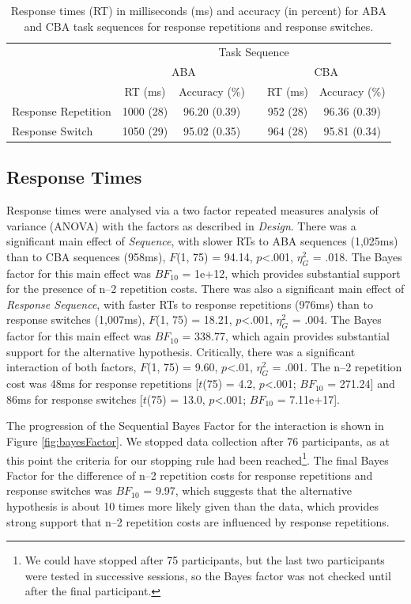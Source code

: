 \documentclass[a4paper, man, natbib]{apa6}
\begin{document}
\begin{table}[htbp]
\centering
\caption{Response times (RT) in milliseconds (ms) and accuracy (in percent) for ABA and CBA task sequences for response repetitions and response switches.}
\label{my-label}
\begin{tabular}{lccccc}
\hline
                    & \multicolumn{5}{c}{Task Sequence}                       \\ \cline{2-6} 
                    & \multicolumn{2}{c}{ABA}   &  & \multicolumn{2}{c}{CBA}  \\ \cline{2-3} \cline{5-6} 
                    & RT (ms)   & Accuracy (\%) &  & RT (ms)  & Accuracy (\%) \\ \hline
Response Repetition & 1000 (28) & 96.20 (0.39)  &  & 952 (28) & 96.36 (0.39) \\
Response Switch     & 1050 (29) & 95.02 (0.35)  &  & 964 (28) & 95.81 (0.34) \\ \hline
\end{tabular}
\label{tab:behaviouralData}
\end{table}

\subsection{Response Times}
Response times were analysed via a two factor repeated measures analysis of variance (ANOVA) with the factors as described in \emph{Design}. There was a significant main effect of \emph{Sequence}, with slower RTs to ABA sequences (1,025ms) than to CBA sequences (958ms), $F$(1, 75) = 94.14, $p$<.001, $\eta_G^2$ = .018. The Bayes factor for this main effect was $BF_{10}$ = 1e+12, which provides substantial support for the presence of n--2 repetition costs. There was also a significant main effect of \emph{Response Sequence}, with faster RTs to response repetitions (976ms) than to response switches (1,007ms), $F$(1, 75) = 18.21, $p$<.001, $\eta_G^2$ = .004. The Bayes factor for this main effect was $BF_{10}$ = 338.77, which again provides substantial support for the alternative hypothesis. Critically, there was a significant interaction of both factors, $F$(1, 75) = 9.60, $p$<.01, $\eta_G^2$ = .001. The n--2 repetition cost was 48ms for response repetitions [$t$(75) = 4.2, $p$<.001; $BF_{10}$ = 271.24] and 86ms for response switches [$t$(75) = 13.0, $p$<.001; $BF_{10}$ = 7.11e+17]. 

The progression of the Sequential Bayes Factor for the interaction is shown in Figure \ref{fig:bayesFactor}. We stopped data collection after 76 participants, as at this point the criteria for our stopping rule had been reached\footnote{We could have stopped after 75 participants, but the last two participants were tested in successive sessions, so the Bayes factor was not checked until after the final participant.}. The final Bayes Factor for the difference of n--2 repetition costs for response repetitions and response switches was $BF_{10}$ = 9.97, which suggests that the alternative hypothesis is about 10 times more likely given than the data, which provides strong support that n--2 repetition costs are influenced by response repetitions.
\end{document}
